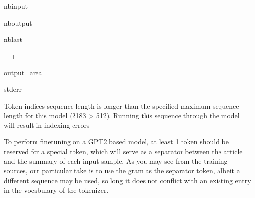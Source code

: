 \documentclass[letterpaper,10pt,english]{sphinxmanual}
\newlength\nbsphinxcodecellspacing
\begin{document}
\begin{sphinxuseclass}{nbinput}
{
\begin{sphinxVerbatim}[commandchars=\\\{\}]
\llap{\color{nbsphinxin}[54]:\,\hspace{\fboxrule}\hspace{\fboxsep}}  
   
   
\end{sphinxVerbatim}
}

\end{sphinxuseclass}
\begin{sphinxuseclass}{nboutput}
\begin{sphinxuseclass}{nblast}
{

\kern-\sphinxverbatimsmallskipamount\kern-\baselineskip
\kern+\FrameHeightAdjust\kern-\fboxrule
\vspace{\nbsphinxcodecellspacing}

\begin{sphinxuseclass}{output_area}
\begin{sphinxuseclass}{stderr}


\begin{sphinxVerbatim}[commandchars=\\\{\}]
Token indices sequence length is longer than the specified maximum sequence length for this model (2183 > 512). Running this sequence through the model will result in indexing errors
\end{sphinxVerbatim}



\end{sphinxuseclass}
\end{sphinxuseclass}
}

\end{sphinxuseclass}
\end{sphinxuseclass}
\sphinxAtStartPar
To perform fine\sphinxhyphen{}tuning on a GPT\sphinxhyphen{}2 based model, at least 1 token should be reserved for a special token, which will serve as a separator between the article and the summary of each input sample. As you may see from the training sources, our particular take is to use the  gram as the separator token, albeit a different sequence may be used, so long it does not conflict with an existing entry in the vocabulary of the tokenizer.
\end{document}
